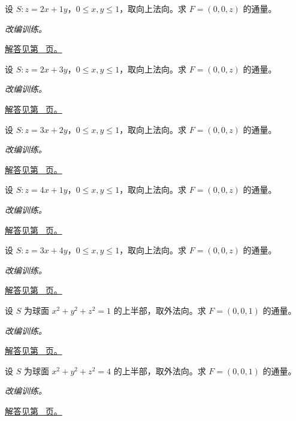 \documentclass[UTF8,12pt,a4paper,fontset=fandol]{ctexart}
\begin{document}
\begin{example}[平面片的向上通量]\label{ex:c42q8}
设 $S:z=2x+1y$，$0\le x,y\le1$，取向上法向。求 $F=(0,0,z)$ 的通量。
\par\textit{改编训练。}\par\hyperref[ans:c42q8]{解答见第~\pageref{ans:c42q8} 页。}
\end{example}
\begin{example}[平面片的向上通量]\label{ex:c42q9}
设 $S:z=2x+3y$，$0\le x,y\le1$，取向上法向。求 $F=(0,0,z)$ 的通量。
\par\textit{改编训练。}\par\hyperref[ans:c42q9]{解答见第~\pageref{ans:c42q9} 页。}
\end{example}
\begin{example}[平面片的向上通量]\label{ex:c42q10}
设 $S:z=3x+2y$，$0\le x,y\le1$，取向上法向。求 $F=(0,0,z)$ 的通量。
\par\textit{改编训练。}\par\hyperref[ans:c42q10]{解答见第~\pageref{ans:c42q10} 页。}
\end{example}
\begin{example}[平面片的向上通量]\label{ex:c42q11}
设 $S:z=4x+1y$，$0\le x,y\le1$，取向上法向。求 $F=(0,0,z)$ 的通量。
\par\textit{改编训练。}\par\hyperref[ans:c42q11]{解答见第~\pageref{ans:c42q11} 页。}
\end{example}
\begin{example}[平面片的向上通量]\label{ex:c42q12}
设 $S:z=3x+4y$，$0\le x,y\le1$，取向上法向。求 $F=(0,0,z)$ 的通量。
\par\textit{改编训练。}\par\hyperref[ans:c42q12]{解答见第~\pageref{ans:c42q12} 页。}
\end{example}
\begin{example}[上半球上的常向量通量]\label{ex:c42q13}
设 $S$ 为球面 $x^2+y^2+z^2=1$ 的上半部，取外法向。求 $F=(0,0,1)$ 的通量。
\par\textit{改编训练。}\par\hyperref[ans:c42q13]{解答见第~\pageref{ans:c42q13} 页。}
\end{example}
\begin{example}[上半球上的常向量通量]\label{ex:c42q14}
设 $S$ 为球面 $x^2+y^2+z^2=4$ 的上半部，取外法向。求 $F=(0,0,1)$ 的通量。
\par\textit{改编训练。}\par\hyperref[ans:c42q14]{解答见第~\pageref{ans:c42q14} 页。}
\end{example}
\end{document}

